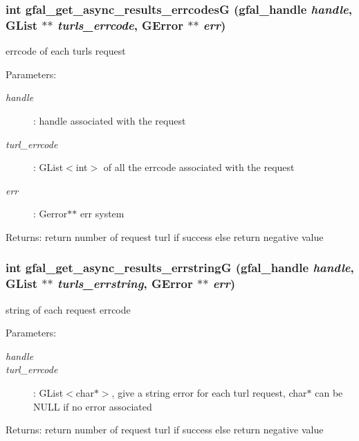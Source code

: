 \subsubsection{\setlength{\rightskip}{0pt plus 5cm}int gfal\_\-get\_\-async\_\-results\_\-errcodes\-G (gfal\_\-handle {\em handle}, GList $\ast$$\ast$ {\em turls\_\-errcode}, GError $\ast$$\ast$ {\em err})}\label{gfal__common__srm_8h_0d1a5a270a56e0123960a0087bc33c08}


errcode of each turls request 

\begin{Desc}
\item[Parameters:]
\begin{description}
\item[{\em handle}]: handle associated with the request \item[{\em turl\_\-errcode}]: GList$<$int$>$ of all the errcode associated with the request \item[{\em err}]: Gerror$\ast$$\ast$ err system \end{description}
\end{Desc}
\begin{Desc}
\item[Returns:]return number of request turl if success else return negative value \end{Desc}
\subsubsection{\setlength{\rightskip}{0pt plus 5cm}int gfal\_\-get\_\-async\_\-results\_\-errstring\-G (gfal\_\-handle {\em handle}, GList $\ast$$\ast$ {\em turls\_\-errstring}, GError $\ast$$\ast$ {\em err})}\label{gfal__common__srm_8h_089643e4b8996a1e8896009f266ccdf0}


string of each request errcode 

\begin{Desc}
\item[Parameters:]
\begin{description}
\item[{\em handle}]\item[{\em turl\_\-errcode}]: GList$<$char$\ast$$>$, give a string error for each turl request, char$\ast$ can be NULL if no error associated \end{description}
\end{Desc}
\begin{Desc}
\item[Returns:]return number of request turl if success else return negative value \end{Desc}
